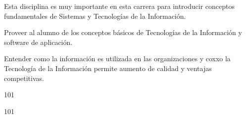 ﻿\begin{syllabus}


\begin{justification}
Esta disciplina es muy importante en esta carrera para introducir conceptos fundamentales de Sistemas y Tecnologías de la Información.
\end{justification}

\begin{goals}
\item Proveer al alumno de los conceptos básicos de Tecnologías de la Información y software de aplicación.
\item Entender como la información es utilizada en las organizaciones y coxxo la Tecnología de la Información permite aumento de calidad y ventajas competitivas.
\end{goals}

\begin{outcomes}
\end{outcomes}

\begin{unit}{\LUFIVEDef}{\LUFIVEBib}{10}{1}
   \begin{topics}
      \item \OMCTWOTopicTWOxTWOxONEOH
      \item \TDSONETopicTHREExONExONE
      \item \TDSONETopicTHREExONExTWO
      \item \TDSONETopicTHREExONExTHREE
      \item \TDSONETopicTHREExONExFOUR
      \item \TDSONETopicTHREExONExFIVE
   \end{topics}
	\LUFIVEGoal
\end{unit}

\begin{unit}{\LUSIXDef}{\LUSIXBib}{10}{1}
   \begin{topics}
      \item \OMCTHREETopicTWOxTHREExONE
      \item \OMCTHREETopicTWOxTHREExTWO
      \item \OMCTHREETopicTWOxTHREExTHREE
   \end{topics}
	\LUSIXGoal
\end{unit}


\end{syllabus}
